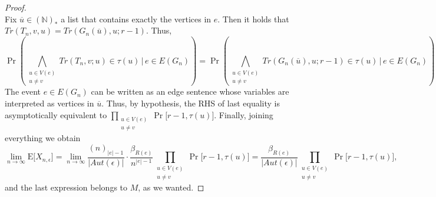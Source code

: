 \documentclass[12pt,notitlepage,a4paper]{article}
\theoremstyle{definition}
\newcommand{\N}{\mathbb{N}}
\newcommand{\Ln}{\lim\limits_{n\to \infty}}
\begin{document}
\begin{proof}
\[		\]
		Fix $\overline{u}\in (\N)_*$ a list that contains exactly the vertices
		in $e$. Then it holds that
		$Tr(T_{n}, v, u)=Tr(G_n(\overline{u}),u;r-1)$. 
		Thus,
		\[
		\Pr	\left(
		\bigwedge_{\substack{u\in V(e)\\ u\neq v} } Tr(T_{n}, v; u)\in \tau(u) 
		\, \Bigg| \,  e\in E(G_n) \right)
		=
		\Pr \left(
		\bigwedge_{\substack{u\in V(e)\\ u\neq v} } Tr(G_n(\overline{u}), u;
		r-1)\in \tau(u) \, \Bigg| \,  e\in E(G_n) \right)
		\]		
		The event $e\in E(G_n)$ can be written as an edge sentence
		whose variables are interpreted as vertices in $\overline{u}$.
		Thus, by hypothesis, the RHS of last equality
		is asymptotically equivalent to
		$\prod_{\substack{u\in V(e)\\ u\neq v} } \Pr\big[
		r-1, \tau(u)\big]$.
		Finally, joining everything we obtain
		\[
		\Ln
		\mathrm{E}\big[ X_{n,\epsilon} \big]
		= \Ln \frac{(n)_{|e|-1}}{|Aut(\epsilon)|}
		\cdot  \frac{\beta_{R(e)}}{n^{|e|-1}}
		\prod_{\substack{u\in V(e)\\ u\neq v} }
		\Pr\big[
		r-1, \tau(u)\big] =
		\frac{\beta_{R(e)}}{|Aut(\epsilon)|} 
		\prod_{\substack{u\in V(e)\\ u\neq v} } \Pr\big[
		r-1, \tau(u)\big],
		\]
		and the last expression belongs to $M$, as we wanted.\par
		

\end{proof}
\end{document}
